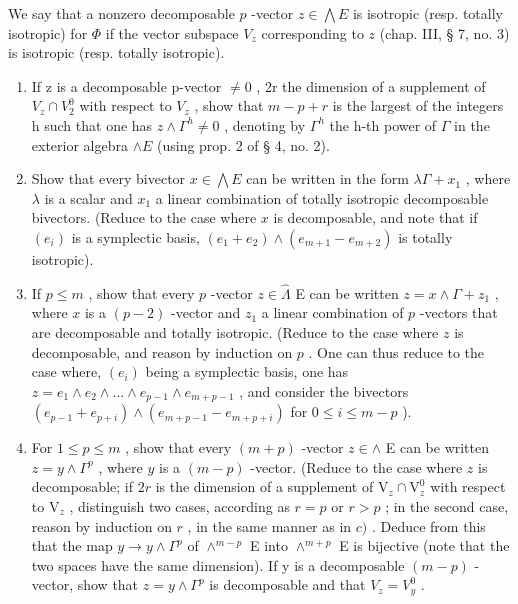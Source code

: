We say that a nonzero decomposable \(p\) -vector \(z \in \bigwedge E\) is isotropic (resp. totally isotropic) for \(\Phi\) if the vector subspace \(V_z\) corresponding to \(z\) (chap. III, § 7, no. 3) is isotropic (resp. totally isotropic).

\begin{enumerate}
\def\labelenumi{\alph{enumi})}
\item
  If z is a decomposable p-vector \(\neq0\) , 2r the dimension of a supplement of \(V_{z}\cap V_{2}^{0}\) with respect to \(V_{z}\) , show that \(m-p+r\) is the largest of the integers h such that one has \(z\wedge\Gamma^{h}\neq0\) , denoting by \(\Gamma^{h}\) the h-th power of \(\Gamma\) in the exterior algebra \(\wedge E\) (using prop. 2 of § 4, no. 2).
\item
  Show that every bivector \(x \in \bigwedge E\) can be written in the form \(\lambda \Gamma + x_{1}\) , where \(\lambda\) is a scalar and \(x_{1}\) a linear combination of totally isotropic decomposable bivectors. (Reduce to the case where \(x\) is decomposable, and note that if \((e_{i})\) is a symplectic basis, \((e_{1} + e_{2}) \wedge (e_{m+1} - e_{m+2})\) is totally isotropic).
\item
  If \(p \leqslant m\) , show that every \(p\) -vector \(z \in \hat{\Lambda}\) E can be written \(z = x \wedge \Gamma + z_1\) , where \(x\) is a \((p - 2)\) -vector and \(z_1\) a linear combination of \(p\) -vectors that are decomposable and totally isotropic. (Reduce to the case where \(z\) is decomposable, and reason by induction on \(p\) . One can thus reduce to the case where, \((e_i)\) being a symplectic basis, one has \(z = e_1 \wedge e_2 \wedge \ldots \wedge e_{p-1} \wedge e_{m+p-1}\) , and consider the bivectors \((e_{p-1} + e_{p+i}) \wedge (e_{m+p-1} - e_{m+p+i})\) for \(0 \leqslant i \leqslant m - p\) ).
\item
  For \(1 \leqslant p \leqslant m\) , show that every \((m+p)\) -vector \(z \in \wedge\) E can be written \(z = y \wedge \Gamma^p\) , where \(y\) is a \((m-p)\) -vector. (Reduce to the case where \(z\) is decomposable; if \(2r\) is the dimension of a supplement of \(\mathrm{V}_z \cap \mathrm{V}_z^0\) with respect to \(\mathrm{V}_z\) , distinguish two cases, according as \(r = p\) or \(r > p\) ; in the second case, reason by induction on \(r\) , in the same manner as in \(c)\) . Deduce from this that the map \(y \to y \wedge \Gamma^p\) of \(\wedge^{m-p}\) E into \(\wedge^{m+p}\) E is bijective (note that the two spaces have the same dimension). If y is a decomposable \((m-p)\) -vector, show that \(z = y \wedge \Gamma^{p}\) is decomposable and that \(V_{z} = V_{y}^{0}\) .
\end{enumerate}

